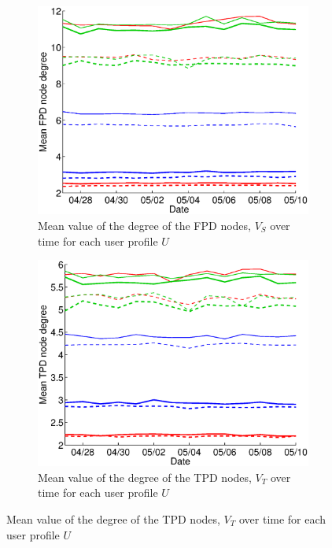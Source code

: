 \documentclass{sig-alternate}
\begin{document}
    \begin{figure}
   \centering

   \begin{subfigure}{.45\textwidth}
    \includegraphics[width=\textwidth]{figures/plots/first-means-entities.eps}
    \caption{Mean value of the degree of the FPD nodes, $V_S$ over time for each user profile $U$}
    \label{fig:first_means_entities}
  \end{subfigure}

  \begin{subfigure}{.45\textwidth}
    \includegraphics[width=\textwidth]{figures/plots/third-means-entities.eps}
    \caption{Mean value of the degree of the TPD nodes, $V_T$ over time for each user profile $U$}
    \label{fig:third_means_entities}
  \end{subfigure}


\end{figure}
\end{document}
